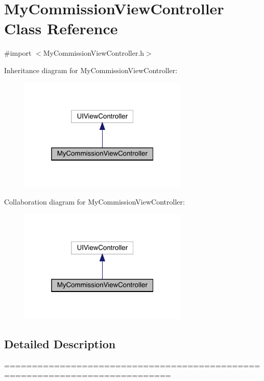 \hypertarget{interface_my_commission_view_controller}{}\section{My\+Commission\+View\+Controller Class Reference}
\label{interface_my_commission_view_controller}


{\ttfamily \#import $<$My\+Commission\+View\+Controller.\+h$>$}



Inheritance diagram for My\+Commission\+View\+Controller\+:\nopagebreak
\begin{figure}[H]
\begin{center}
\leavevmode
\includegraphics[width=229pt]{interface_my_commission_view_controller__inherit__graph}
\end{center}
\end{figure}


Collaboration diagram for My\+Commission\+View\+Controller\+:\nopagebreak
\begin{figure}[H]
\begin{center}
\leavevmode
\includegraphics[width=229pt]{interface_my_commission_view_controller__coll__graph}
\end{center}
\end{figure}


\subsection{Detailed Description}
============================================================================

